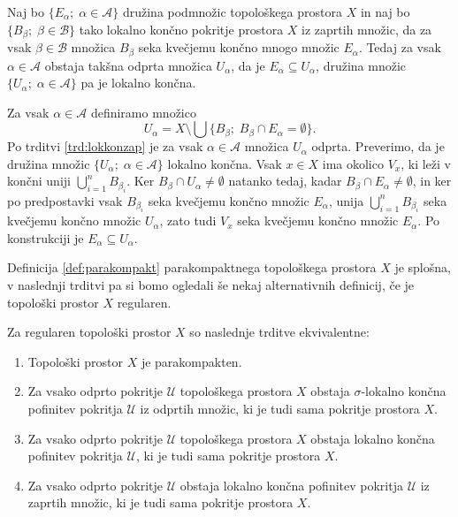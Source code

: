 \documentclass[mat1]{fmfdelo}
\begin{document}
\begin{trditev}\label{trd:lokkonvlozitev}
Naj bo $\lbrace E_\alpha ;\; \alpha \in \mathcal{A} \rbrace$ družina podmnožic topološkega prostora $X$ in naj bo $\lbrace B_\beta ;\; \beta \in \mathcal{B} \rbrace$ tako lokalno končno pokritje prostora $X$ iz zaprtih množic, da za vsak $\beta \in \mathcal{B}$ množica $B_\beta$ seka kvečjemu končno mnogo množic $E_\alpha$.
Tedaj za vsak $\alpha \in \mathcal{A}$ obstaja takšna odprta množica $U_\alpha$, da je $E_\alpha \subseteq U_\alpha$, družina množic $\lbrace U_\alpha ;\; \alpha \in \mathcal{A} \rbrace$ pa je lokalno končna.
\end{trditev}

\begin{dokaz}
Za vsak $\alpha \in \mathcal{A}$ definiramo množico
\[ U_\alpha = X \setminus \bigcup\lbrace B_\beta ;\; B_\beta \cap E_\alpha = \emptyset\rbrace. \]
Po trditvi \ref{trd:lokkonzap} je za vsak $\alpha \in \mathcal{A}$ množica $U_\alpha$ odprta. Preverimo, da je družina množic $\lbrace U_\alpha ;\; \alpha \in \mathcal{A} \rbrace$ lokalno končna. Vsak $x \in X$ ima okolico $V_x$, ki leži v končni uniji $\bigcup_{i = 1}^n B_{\beta_i}$. Ker $B_\beta \cap U_\alpha \neq \emptyset$ natanko tedaj, kadar $B_\beta \cap E_\alpha \neq \emptyset$, in ker po predpostavki vsak $B_{\beta_i}$ seka kvečjemu končno množic $E_\alpha$, unija $\bigcup_{i = 1}^n B_{\beta_i}$ seka kvečjemu končno množic $U_\alpha$, zato tudi $V_x$ seka kvečjemu končno množic $E_\alpha$. Po konstrukciji je $E_\alpha \subseteq U_\alpha$.
\end{dokaz}

Definicija \ref{def:parakompakt} parakompaktnega topološkega prostora $X$ je splošna, v naslednji trditvi pa si bomo ogledali še nekaj alternativnih definicij, če je topološki prostor $X$ regularen.

\begin{trditev}\label{trd:parakompkar}
Za regularen topološki prostor $X$ so naslednje trditve ekvivalentne:
\begin{enumerate}
\item Topološki prostor $X$ je parakompakten.\label{podtrd:parakompkar1}
\item Za vsako odprto pokritje $\mathcal{U}$ topološkega prostora $X$ obstaja $\sigma$-lokalno končna pofinitev pokritja $\mathcal{U}$ iz odprtih množic, ki je tudi sama pokritje prostora $X$.\label{podtrd:parakompkar2}
\item Za vsako odprto pokritje $\mathcal{U}$ topološkega prostora $X$ obstaja lokalno končna pofinitev pokritja $\mathcal{U}$, ki je tudi sama pokritje prostora $X$.\label{podtrd:parakompkar3}
\item Za vsako odprto pokritje $\mathcal{U}$ obstaja lokalno končna pofinitev pokritja $\mathcal{U}$ iz zaprtih množic, ki je tudi sama pokritje prostora $X$.\label{podtrd:parakompkar4}
\end{enumerate}
\end{trditev}
\end{document}
